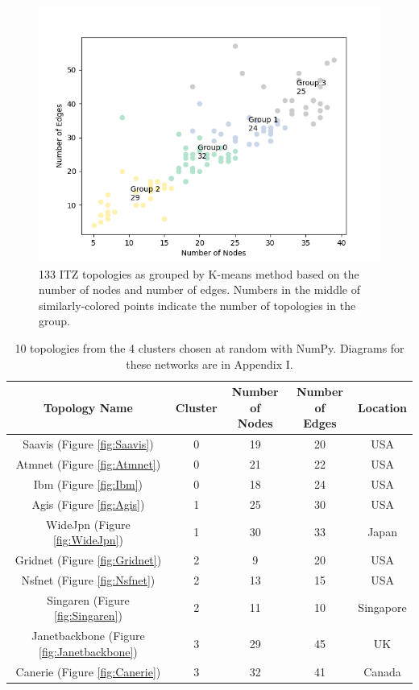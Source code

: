 \begin{figure}[htbp]
    \centering
    \includegraphics[width=\textwidth]{Figures/clusters.png}
    \caption{133 ITZ topologies as grouped by K-means method based on the number of nodes and number of edges. Numbers in the middle of similarly-colored points indicate the number of topologies in the group.}
    \label{fig:groups}
\end{figure}

\begin{table}[htbp]
    \centering
    \begin{tabular}{ccccc}
    \toprule
        Topology Name & Cluster & \makecell{Number of\\ Nodes} & \makecell{Number of \\Edges} & Location \\
    \midrule
        Saavis (Figure \ref{fig:Saavis}) & 0 & 19 & 20 & USA \\
        Atmnet (Figure \ref{fig:Atmnet})& 0 & 21 & 22 & USA \\
        Ibm (Figure \ref{fig:Ibm})& 0 & 18 & 24 & USA \\
        Agis (Figure \ref{fig:Agis})& 1 & 25 & 30 & USA \\
        WideJpn (Figure \ref{fig:WideJpn})& 1 & 30 & 33 & Japan \\
        Gridnet (Figure \ref{fig:Gridnet})& 2 & 9 & 20 & USA \\
        Nsfnet (Figure \ref{fig:Nsfnet})& 2 & 13 & 15 & USA \\
        Singaren (Figure \ref{fig:Singaren})& 2 & 11 & 10 & Singapore \\
        Janetbackbone (Figure \ref{fig:Janetbackbone})& 3 & 29 & 45 & UK \\
        Canerie (Figure \ref{fig:Canerie})& 3 & 32 & 41 & Canada \\
    \bottomrule
    \end{tabular}
    \caption{10 topologies from the 4 clusters chosen at random with NumPy. Diagrams for these networks are in Appendix I.}
    \label{tab:choices}
\end{table}

